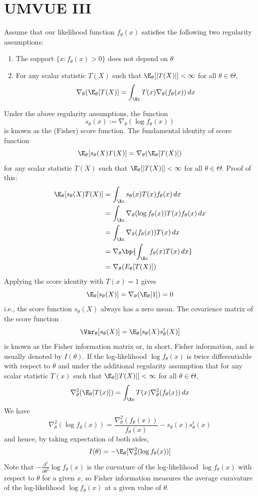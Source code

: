 \chapter{UMVUE III}
Assume that our likelihood function $f_\theta(x)$ satisfies the following two regularity assumptions:
\begin{enumerate}
    \item The support $\{x : f_\theta(x) > 0 \}$ does not depend on $\theta$
    \item For any scalar statistic $T(X)$ such that $\E_\theta[|T(X)|] < \infty$ for all $\theta \in \Theta$,
          \[
              \nabla_\theta (\E_\theta[T(X)] = \int_{\Xc} T(x) \nabla_\theta (f_\theta(x)) \, dx
          \]
\end{enumerate}
Under the above regularity assumptions, the function
\[
    s_\theta(x) := \nabla_\theta(\log f_\theta(x))
\]
is known as the (Fisher) score function. The fundamental identity of score function
\[
    \E_\theta[s_\theta(X)T(X)] = \nabla_\theta(\E_\theta[T(X)])
\]
for any scalar statistic $T(X)$ such that $\E_\theta[|T(X)|] < \infty$ for all $\theta \in \Theta$. Proof of this:
\begin{align*}
    \E_\theta[s_\theta(X)T(X)] & = \int_{\Xc} s_\theta(x)T(x)f_\theta(x) \, dx                        \\
                               & = \int_{\Xc} \nabla_\theta (\log f_\theta(x)) T(x) f_\theta(x) \, dx \\
                               & = \int_{\Xc} \nabla_\theta(f_\theta(x)) T(x) \, dx                   \\
                               & = \nabla_\theta \bp{\int_{\Xc} f_\theta(x) T(x) \, dx}               \\
                               & = \nabla_\theta (E_\theta[T(X)])
\end{align*}
Applying the score identity with $T(x) = 1$ gives
\[
    \E_\theta[s_\theta(X)] = \nabla_\theta (\E_\theta[1]) = 0
\]
i.e., the score function $s_\theta(X)$ always has a zero mean. The covarience matrix of the score function
\[
    \Var_\theta[s_\theta(X)] = \E_\theta[s_\theta(X)s_\theta^t (X)]
\]
is known as the Fisher information matrix or, in short, Fisher information, and is usually denoted by $I(\theta)$. If the log-likelihood $\log f_\theta(x)$ is twice differentiable with respect to $\theta$ and under the additional regularity assumption that for any scalar
statistic $T(x)$ such that $\E_\theta[|T(X)|] < \infty$ for all $\theta \in \Theta$,
\[
    \nabla_\theta^2 (\E_\theta[T(x)]) = \int_{\Xc} T(x) \nabla_\theta^2 (f_\theta(x)) \, dx
\]
We have
\[
    \nabla_\theta^2 (\log f_\theta(x)) = \frac{\nabla_\theta^2 (f_\theta(x))}{f_\theta(x)} - s_\theta(x) s_\theta^t(x)
\]
and hence, by taking expectation of both sides,
\[
    I(\theta) = -\E_\theta[\nabla_\theta^2 (\log f_\theta(x))]
\]
Note that $-\frac{\partial^2}{\partial \theta^2} \log f_\theta(x)$ is the curvature of the log-likelihood $\log f_\theta(x)$ with respect to $\theta$ for a given $x$, so Fisher information measures the average curavature of the log-likelihood $\log f_\theta(x)$ at a given value of $\theta$.
